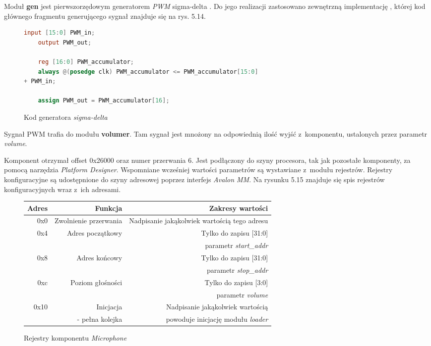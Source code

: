 Moduł \textbf{gen} jest pierwszorzędowym generatorem \textit{PWM} \cite{Wiki:PWM} sigma-delta \cite{Wiki:Sigma}. Do jego realizacji zastosowano zewnętrzną implementację \cite{SigmaDeltaI}, której kod głównego fragmentu generującego sygnał znajduje się na rys. 5.14.


\begin{figure}[h]
\begin{lstlisting}[language=Verilog]
	input [15:0] PWM_in;
	output PWM_out;
	
	reg [16:0] PWM_accumulator;
	always @(posedge clk) PWM_accumulator <= PWM_accumulator[15:0] 
+ PWM_in;
	
	assign PWM_out = PWM_accumulator[16];
\end{lstlisting}
	\caption{Kod generatora \textit{sigma-delta}}
\end{figure}
\FloatBarrier %

Sygnał PWM trafia do modułu \textbf{volumer}. Tam sygnał jest mnożony na odpowiednią ilość wyjść z~komponentu, ustalonych przez parametr \textit{volume}.

Komponent otrzymał offset 0x26000 oraz numer przerwania 6. Jest podłączony do szyny procesora, tak jak pozostałe komponenty, za pomocą narzędzia \textit{Platform Designer}. Wspomniane wcześniej wartości parametrów są wystawiane z~modułu rejestrów. Rejestry konfiguracyjne są udostępnione do szyny adresowej poprzez interfejs \textit{Avalon MM}. Na rysunku 5.15 znajduje się spis rejestrów konfiguracyjnych wraz z~ich adresami.
 
 \begin{figure}[h]
 	\centering
 	\begin{tabular}{|r|r|r|}
 		\hline
 		Adres & Funkcja & Zakresy wartości\\
 		\hline
 		0x0 & Zwolnienie przerwania & Nadpisanie jakąkolwiek wartością tego adresu\\
 		\hline 
 		0x4 & Adres początkowy & Tylko do zapisu [31:0]  \\
 			&				   & parametr \textit{start\_addr} \\
 		\hline
 		0x8 & Adres końcowy	 & Tylko do zapisu [31:0] \\
 			&				 & parametr \textit{stop\_addr}\\
 		\hline
 		0xc & Poziom głośności	& Tylko do zapisu [3:0] \\
 			&				    & parametr \textit{volume}\\
 		
 		\hline 
  		0x10 & Inicjacja	 	& Nadpisanie jakąkolwiek wartością \\
 		   	 &- pełna kolejka    & powoduje inicjację modułu \textit{loader}\\		
 		\hline
 	\end{tabular}
 	
 	\caption{Rejestry komponentu \textit{Microphone}}
 \end{figure}
 \FloatBarrier %
 
